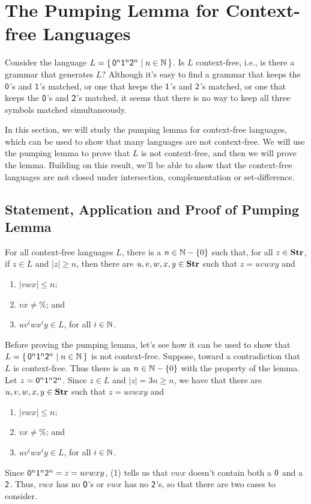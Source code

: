 \section{The Pumping Lemma for Context-free Languages}
\label{ThePumpingLemmaForContextFreeLanguages}

Consider the language $L =
\{ \, \mathsf{0}^n\mathsf{1}^n\mathsf{2}^n \mid n\in\mathbb{N} \, \}$.  Is $L$ context-free,
i.e., is there a grammar that generates $L$?  Although it's easy to
find a grammar that keeps the $\mathsf{0}$'s and $\mathsf{1}$'s matched, or
one that keeps the $\mathsf{1}$'s and $\mathsf{2}$'s matched, or one that
keeps the $\mathsf{0}$'s and $\mathsf{2}$'s matched, it seems that there is
no way to keep all three symbols matched simultaneously.

In this section, we will study the pumping lemma for context-free
languages, which can be used to show that many languages are not
context-free.  We will use the pumping lemma to prove that $L$ is not
context-free, and then we will prove the lemma.  Building on this
result, we'll be able to show that the context-free languages are not
closed under intersection, complementation or set-difference.

\subsection{Statement, Application and Proof of Pumping Lemma}

\begin{lemma}
For all context-free languages $L$, there is a
$n\in\mathbb{N}-\{0\}$ such that, for all $z\in\mathbf{Str}$, if $z\in L$
and $|z|\geq n$, then there are $u,v,w,x,y\in\mathbf{Str}$ such
that $z=uvwxy$ and
\begin{enumerate}[\quad(1)]
\item $|vwx|\leq n$;

\item $vx\neq\%$; and

\item $uv^iwx^iy\in L$, for all $i\in\mathbb{N}$.
\end{enumerate}
\end{lemma}

Before proving the pumping lemma, let's see how it can be used to show
that $L=\{ \, \mathsf{0}^n\mathsf{1}^n\mathsf{2}^n \mid n\in\mathbb{N} \, \}$ is not
context-free.  Suppose, toward a contradiction that $L$ is
context-free.  Thus there is an $n\in\mathbb{N}-\{0\}$ with the property of the
lemma.  Let $z={\mathsf{0}^n\mathsf{1}^n\mathsf{2}^n}$.
Since $z\in L$ and $|z|=3n\geq n$, we have that there are
$u,v,w,x,y\in\mathbf{Str}$ such that $z=uvwxy$ and
\begin{enumerate}[\quad(1)]
\item $|vwx|\leq n$;

\item $vx\neq\%$; and

\item $uv^iwx^iy\in L$, for all $i\in\mathbb{N}$.
\end{enumerate}
Since $\mathsf{0}^n\mathsf{1}^n\mathsf{2}^n=z=uvwxy$, (1) tells us that
$vwx$ doesn't contain both a $\mathsf{0}$ and a $\mathsf{2}$.
Thus, $vwx$ has no $\mathsf{0}$'s or $vwx$ has no $\mathsf{2}$'s, so that
there are two cases to consider.

